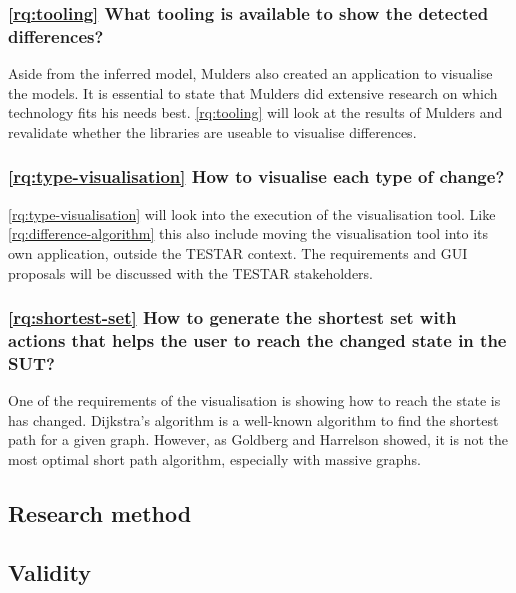 \subsubsection{\ref{rq:tooling} What tooling is available to show the detected differences?}
Aside from the inferred model, Mulders also created an application to visualise the models. It is essential to state that Mulders did extensive research on which technology fits his needs best. \ref{rq:tooling} will look at the results of Mulders and revalidate whether the libraries are useable to visualise differences. 

\subsubsection{\ref{rq:type-visualisation} How to visualise each type of change?}
\ref{rq:type-visualisation} will look into the execution of the visualisation tool. Like \ref{rq:difference-algorithm} this also include moving the visualisation tool into its own application, outside the TESTAR context. The requirements and GUI proposals will be discussed with the TESTAR stakeholders. 

\subsubsection{\ref{rq:shortest-set} How to generate the shortest set with actions that helps the user to reach the changed state in the SUT?}
One of the requirements of the visualisation is showing how to reach the state is has changed. Dijkstra's algorithm \cite{dijkstra1959note} is a well-known algorithm to find the shortest path for a given graph. However, as Goldberg and Harrelson \cite{goldberg2005computing} showed, it is not the most optimal short path algorithm, especially with massive graphs. 


    \subsection{Research method}
    
        
        
    \subsection{Validity}
    

    
